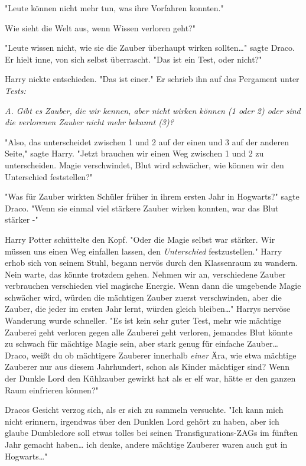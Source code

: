{"Leute können nicht mehr tun, was ihre Vorfahren konnten."

Wie sieht die Welt aus, wenn Wissen verloren geht?"

"Leute wissen nicht, wie sie die Zauber überhaupt wirken sollten…" sagte Draco. Er hielt inne, von sich selbst überrascht. "Das ist ein Test, oder nicht?"

Harry nickte entschieden. "Das ist einer." Er schrieb ihn auf das Pergament unter \emph{Tests:}

\emph{A. Gibt es Zauber, die wir kennen, aber nicht wirken können (1 oder 2) oder sind die verlorenen Zauber nicht mehr bekannt (3)?}

"Also, das unterscheidet zwischen 1 und 2 auf der einen und 3 auf der anderen Seite," sagte Harry. "Jetzt brauchen wir einen Weg zwischen 1 und 2 zu unterscheiden. Magie verschwindet, Blut wird schwächer, wie können wir den Unterschied feststellen?"

"Was für Zauber wirkten Schüler früher in ihrem ersten Jahr in Hogwarts?" sagte Draco. "Wenn sie einmal viel stärkere Zauber wirken konnten, war das Blut stärker -"

Harry Potter schüttelte den Kopf. "Oder die Magie selbst war stärker. Wir müssen uns einen Weg einfallen lassen, den \emph{Unterschied} festzustellen." Harry erhob sich von seinem Stuhl, begann nervös durch den Klassenraum zu wandern. Nein warte, das könnte trotzdem gehen. Nehmen wir an, verschiedene Zauber verbrauchen verschieden viel magische Energie. Wenn dann die umgebende Magie schwächer wird, würden die mächtigen Zauber zuerst verschwinden, aber die Zauber, die jeder im ersten Jahr lernt, würden gleich bleiben…" Harrys nervöse Wanderung wurde schneller. "Es ist kein sehr guter Test, mehr wie mächtige Zauberei geht verloren gegen alle Zauberei geht verloren, jemandes Blut könnte zu schwach für mächtige Magie sein, aber stark genug für einfache Zauber… Draco, weißt du ob mächtigere Zauberer innerhalb \emph{einer} Ära, wie etwa mächtige Zauberer nur aus diesem Jahrhundert, schon als Kinder mächtiger sind? Wenn der Dunkle Lord den Kühlzauber gewirkt hat als er elf war, hätte er den ganzen Raum einfrieren können?"

Dracos Gesicht verzog sich, als er sich zu sammeln versuchte. "Ich kann mich nicht erinnern, irgendwas über den Dunklen Lord gehört zu haben, aber ich glaube Dumbledore soll etwas tolles bei seinen Transfigurations-ZAGs im fünften Jahr gemacht haben… ich denke, andere mächtige Zauberer waren auch gut in Hogwarts…"

}

